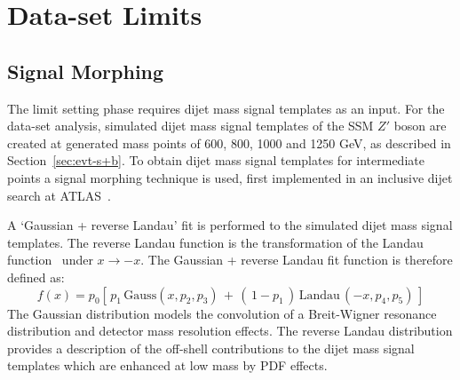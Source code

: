 \vfill
\clearpage

\section{\lm{} Data-set Limits}
\label{sec:lim-full}

\subsection{Signal Morphing}
\label{sec:lim-full_morphing}

The limit setting phase requires dijet mass signal templates as an input.
For the \lm{} data-set analysis, simulated dijet mass signal templates of the SSM $Z'$ boson are created at generated mass points of
600, 800, 1000 and 1250 GeV, as described in Section~\ref{sec:evt-s+b}.
To obtain dijet mass signal templates for intermediate points a signal morphing technique is used,
first implemented in an inclusive dijet search at ATLAS~\cite{dijet-mori17_paper}.

A `Gaussian + reverse Landau' fit is performed to the simulated dijet mass signal templates.
The reverse Landau function is the transformation of the Landau function~\cite{lim-landau} under $x\to-x$.
The Gaussian + reverse Landau fit function is therefore defined as:
\begin{equation}
  f(x)=p_0 \left[ \,p_1\,\mathrm{Gauss}\left(x,p_2,p_3\right)\,+\,\left(\,1-p_1\,\right)\,\mathrm{Landau}\,\left(-x,p_4,p_5\right)\, \right]
\end{equation}
The Gaussian distribution models the convolution of a Breit-Wigner resonance distribution and detector mass resolution effects.
The reverse Landau distribution provides a description of the off-shell contributions to the dijet mass signal templates which are enhanced at low mass by PDF effects.

